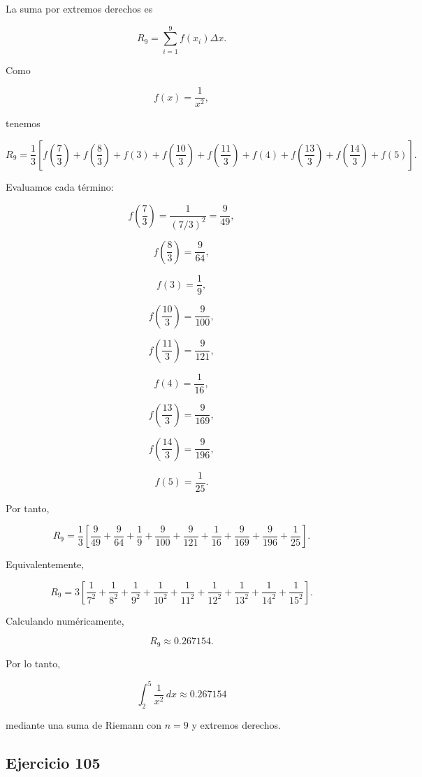 \documentclass[12pt]{article}
\begin{document}
La suma por extremos derechos es

\[
R_9
=
\sum_{i=1}^{9} f(x_i)\Delta x.
\]

Como

\[
f(x)=\frac1{x^2},
\]

tenemos

\[
R_9
=
\frac13
\left[
f\left(\frac73\right)
+
f\left(\frac83\right)
+
f(3)
+
f\left(\frac{10}{3}\right)
+
f\left(\frac{11}{3}\right)
+
f(4)
+
f\left(\frac{13}{3}\right)
+
f\left(\frac{14}{3}\right)
+
f(5)
\right].
\]

Evaluamos cada término:

\[
f\left(\frac73\right)
=
\frac{1}{(7/3)^2}
=
\frac9{49},
\]

\[
f\left(\frac83\right)
=
\frac9{64},
\]

\[
f(3)=\frac19,
\]

\[
f\left(\frac{10}{3}\right)
=
\frac9{100},
\]

\[
f\left(\frac{11}{3}\right)
=
\frac9{121},
\]

\[
f(4)=\frac1{16},
\]

\[
f\left(\frac{13}{3}\right)
=
\frac9{169},
\]

\[
f\left(\frac{14}{3}\right)
=
\frac9{196},
\]

\[
f(5)=\frac1{25}.
\]

Por tanto,

\[
R_9
=
\frac13
\left[
\frac9{49}
+
\frac9{64}
+
\frac19
+
\frac9{100}
+
\frac9{121}
+
\frac1{16}
+
\frac9{169}
+
\frac9{196}
+
\frac1{25}
\right].
\]

Equivalentemente,

\[
R_9
=
3\left[
\frac1{7^2}
+\frac1{8^2}
+\frac1{9^2}
+\frac1{10^2}
+\frac1{11^2}
+\frac1{12^2}
+\frac1{13^2}
+\frac1{14^2}
+\frac1{15^2}
\right].
\]

Calculando numéricamente,

\[
R_9\approx 0.267154.
\]

Por lo tanto,

\[
\boxed{
\int_{2}^{5}\frac1{x^2}\,dx
\approx 0.267154
}
\]

mediante una suma de Riemann con \(n=9\) y extremos derechos.

\subsection*{Ejercicio 105}
\end{document}
